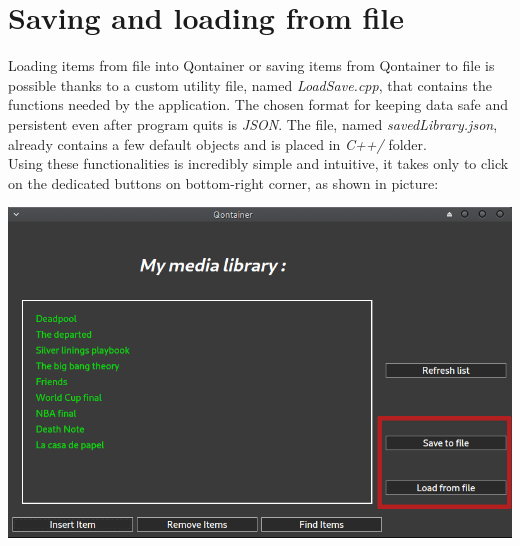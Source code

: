 \section{Saving and loading from file}

Loading items from file into Qontainer or saving items from Qontainer to file is possible thanks to a custom utility file, named \emph{LoadSave.cpp}, that contains the functions needed by the application. The chosen format for keeping data safe and persistent even after program quits is \emph{JSON}. The file, named \emph{savedLibrary.json}, already contains a few default objects and is placed in \emph{C++/} folder.\\
Using these functionalities is incredibly simple and intuitive, it takes only to click on the dedicated buttons on bottom-right corner, as shown in picture:
\begin{center}
\centering
\includegraphics[scale=2.3]{Img/mainWindow.png}
\end{center}